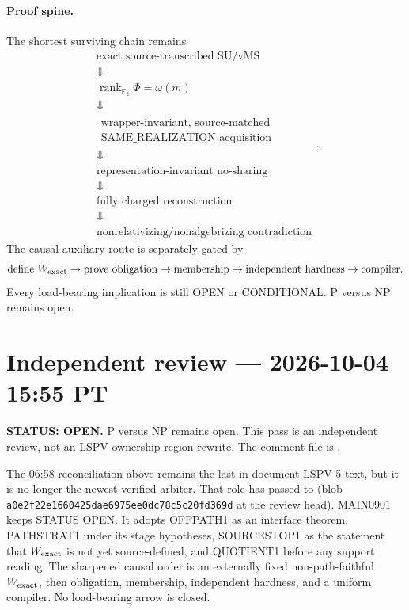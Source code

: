 \documentclass[11pt]{article}
\begin{document}
\paragraph{Proof spine.}
The shortest surviving chain remains
\[
\begin{gathered}
\text{exact source-transcribed SU/vMS}
\\[-1mm]\Downarrow\\[-1mm]
\operatorname{rank}_{\mathbb F_2}\Phi=\omega(m)
\\[-1mm]\Downarrow\\[-1mm]
\substack{\text{wrapper-invariant, source-matched}\\
\text{SAME\_REALIZATION acquisition}}
\\[-1mm]\Downarrow\\[-1mm]
\text{representation-invariant no-sharing}
\\[-1mm]\Downarrow\\[-1mm]
\text{fully charged reconstruction}
\\[-1mm]\Downarrow\\[-1mm]
\text{nonrelativizing/nonalgebrizing contradiction}
\end{gathered}.
\]
The causal auxiliary route is separately gated by
\[
\text{define }W_{\rm exact}
\to
\text{prove obligation}
\to
\text{membership}
\to
\text{independent hardness}
\to
\text{compiler}.
\]
Every load-bearing implication is still OPEN or CONDITIONAL. P versus NP remains open.





\section{Independent review --- 2026-10-04 15:55 PT}
\textbf{STATUS: OPEN.} P versus NP remains open. This pass is an independent review, not an
LSPV ownership-region rewrite. The comment file is
.

The 06:58 reconciliation above remains the last in-document LSPV-5 text, but it is no longer
the newest verified arbiter. That role has passed to
(blob \texttt{a0e2f22e1660425dae6975ee0dc78c5c20fd369d} at the review head).
MAIN0901 keeps STATUS OPEN. It adopts OFFPATH1 as an interface theorem, PATHSTRAT1 under
its stage hypotheses, SOURCESTOP1 as the statement that \(W_{\rm exact}\) is not yet
source-defined, and QUOTIENT1 before any support reading. The sharpened causal order is
an externally fixed non-path-faithful \(W_{\rm exact}\), then obligation, membership,
independent hardness, and a uniform compiler. No load-bearing arrow is closed.
\end{document}
